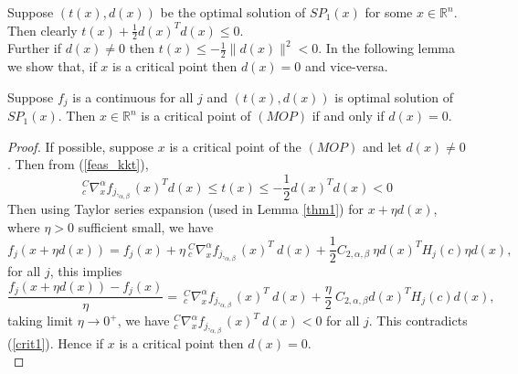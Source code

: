 \documentclass[smallextended,referee,envcountsect]{svjour3}
\begin{document}
Suppose $(t(x),d(x))$ be the optimal solution of $SP_1(x)$ for some $x\in\mathbb{R}^n$. Then clearly $t(x)+\frac{1}{2}d(x)^Td(x) \leq 0.$\\ Further if $d(x)\neq 0$ then $t(x)\leq -\frac{1}{2} \|d(x)\|^2<0.$ In the following lemma we show that, if $x$ is a critical point then $d(x)=0$ and vice-versa.  
\begin{lemma}\label{lemma 3.1}
Suppose $f_j$ is a continuous for all $j$ and $(t(x),d(x))$ is optimal solution of $SP_1(x)$. Then $x\in \mathbb{R}^n$ is a critical point of $(MOP)$ if and only if $d(x)=0$.   
\end{lemma}
\begin{proof}
If possible, suppose $x$ is a critical point of the $(MOP)$ and let $d(x)\neq 0$. Then from (\ref{feas_kkt}),
\begin{equation*}
  {}^C_c\nabla^{\alpha}_x f_{j,_{\alpha,\beta}}(x)^T d(x) \leq t(x) \leq  -\frac{1}{2}d(x)^Td(x) < 0 
\end{equation*}
 Then using Taylor series expansion (used in Lemma \ref{thm1}) for $x+\eta d(x)$, where $\eta>0 $ sufficient small, we have
 \begin{equation*}
    f_j(x+\eta d(x)) = f_j(x) + \eta ~^C_c\nabla^{\alpha}_x f_{j,_{\alpha,\beta}}(x)^T~d(x)+ \frac{1}{2} C_{2,\alpha,\beta} ~ \eta d(x)^T H_j(c)\eta d(x),
\end{equation*} for all $j$, this implies
 \begin{equation*}
    \frac{f_j(x+\eta d(x))-f_j(x)}{\eta}= ~^C_c\nabla^{\alpha}_x f_{j,_{\alpha,\beta}}(x)^T~d(x)+  \frac{\eta}{2}~C_{2,\alpha,\beta} d(x)^T H_j(c) d(x),
\end{equation*}
 taking limit $\eta \rightarrow 0^{+}$, we have $^C_c\nabla^{\alpha}_x f_{j,_{\alpha,\beta}}(x)^T~d(x)<0$ for all $j$. This contradicts (\ref{crit1}). Hence if $x$ is a critical point then $d(x)=0$.\\


\end{proof}
\end{document}
